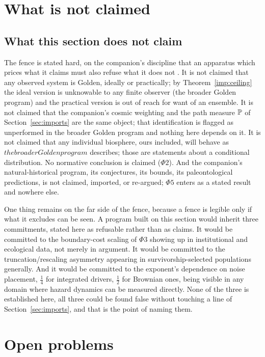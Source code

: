 \section{What is not claimed}\label{sec:fences}

\subsection{What this section does not claim}\label{gr:sub:fence}

The fence is stated hard, on the companion's discipline that an
apparatus which prices what it claims must also refuse what it does not
\cite{AethusOptimalEarth}. It is not claimed that any observed system is Golden, ideally or
practically; by Theorem~\ref{imp:ceiling} the ideal version is
unknowable to any finite observer (the broader Golden program) and
the practical version is out of reach for want of an ensemble. It is not claimed that the companion's cosmic
weighting and the path measure $\mathbb{P}$ of
Section~\ref{sec:imports} are the same object; that
identification is flagged as unperformed in
the broader Golden program and nothing here depends on it. It is not
claimed that any individual biosphere, ours included, will behave as
$the broader Golden program$ describes; those are statements about a
conditional distribution. No normative conclusion is claimed
($\Phi2$). And the companion's natural-historical program, its
conjectures, its bounds, its paleontological predictions, is not
claimed, imported, or re-argued; $\Phi5$ enters as a stated result and
nowhere else.

One thing remains on the far side of the fence, because a fence is
legible only if what it excludes can be seen. A program built on this
section would inherit three commitments, stated here as refusable rather
than as claims. It would be committed to the boundary-cost scaling of
$\Phi3$ showing up in institutional and ecological data, not merely in
argument. It would be committed to the truncation/rescaling asymmetry
appearing in survivorship-selected populations generally. And it would
be committed to the exponent's dependence on noise placement, $\tfrac14$
for integrated drivers, $\tfrac12$ for Brownian ones, being visible
in any domain where hazard dynamics can be measured directly. None of
the three is established here, all three could be found false without
touching a line of Section~\ref{sec:imports}, and that is the
point of naming them.


\section{Open problems}\label{sec:open}


